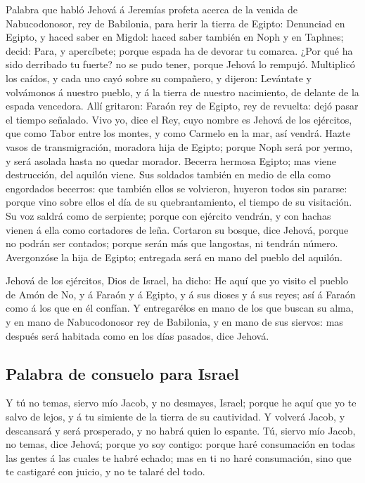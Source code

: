  Palabra que habló Jehová á Jeremías profeta acerca de la
venida de Nabucodonosor, rey de Babilonia, para herir la tierra de
Egipto:  Denunciad en Egipto, y haced saber en Migdol:
haced saber también en Noph y en Taphnes; decid: Para, y apercíbete;
porque espada ha de devorar tu comarca.  ¿Por qué ha sido
derribado tu fuerte? no se pudo tener, porque Jehová lo rempujó.
 Multiplicó los caídos, y cada uno cayó sobre su
compañero, y dijeron: Levántate y volvámonos á nuestro pueblo, y á la
tierra de nuestro nacimiento, de delante de la espada vencedora.
 Allí gritaron: Faraón rey de Egipto, rey de revuelta:
dejó pasar el tiempo señalado.  Vivo yo, dice el Rey,
cuyo nombre es Jehová de los ejércitos, que como Tabor entre los montes,
y como Carmelo en la mar, así vendrá.  Hazte vasos de
transmigración, moradora hija de Egipto; porque Noph será por yermo, y
será asolada hasta no quedar morador.  Becerra hermosa
Egipto; mas viene destrucción, del aquilón viene.  Sus
soldados también en medio de ella como engordados becerros: que también
ellos se volvieron, huyeron todos sin pararse: porque vino sobre ellos
el día de su quebrantamiento, el tiempo de su visitación.
 Su voz saldrá como de serpiente; porque con ejército
vendrán, y con hachas vienen á ella como cortadores de leña.
 Cortaron su bosque, dice Jehová, porque no podrán ser
contados; porque serán más que langostas, ni tendrán número.
 Avergonzóse la hija de Egipto; entregada será en mano
del pueblo del aquilón.

 Jehová de los ejércitos, Dios de Israel, ha dicho: He
aquí que yo visito el pueblo de Amón de No, y á Faraón y á Egipto, y á
sus dioses y á sus reyes; así á Faraón como á los que en él confían.
 Y entregarélos en mano de los que buscan su alma, y en
mano de Nabucodonosor rey de Babilonia, y en mano de sus siervos: mas
después será habitada como en los días pasados, dice Jehová.

\hypertarget{palabra-de-consuelo-para-israel}{%
\subsection{Palabra de consuelo para
Israel}\label{palabra-de-consuelo-para-israel}}

 Y tú no temas, siervo mío Jacob, y no desmayes, Israel;
porque he aquí que yo te salvo de lejos, y á tu simiente de la tierra de
su cautividad. Y volverá Jacob, y descansará y será prosperado, y no
habrá quien lo espante.  Tú, siervo mío Jacob, no temas,
dice Jehová; porque yo soy contigo: porque haré consumación en todas las
gentes á las cuales te habré echado; mas en ti no haré consumación, sino
que te castigaré con juicio, y no te talaré del todo.

